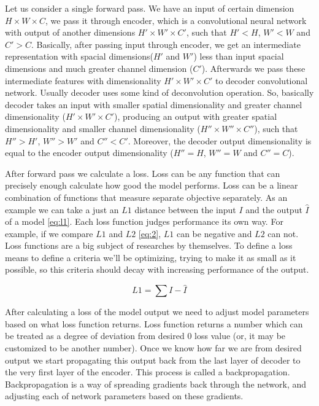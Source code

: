 Let us consider a single forward pass. We have an input of certain dimension $H \times W \times C$, we pass it through encoder, which is a convolutional neural network with output of another dimensions $H' \times W' \times C'$, such that $H' < H$, $W' < W$ and $C' > C$. Basically, after passing input through encoder, we get an intermediate representation with spacial dimensions($H'$ and $W'$) less than input spacial dimensions and much greater channel dimension ($C'$). Afterwards we pass these intermediate features with dimensionality $H' \times W' \times C'$ to decoder convolutional network. Usually decoder uses some kind of deconvolution operation. So, basically decoder takes an input with smaller spatial dimensionality and greater channel dimensionality ($H' \times W' \times C'$), producing an output with greater spatial dimensionality and smaller channel dimensionality ($H'' \times W'' \times C''$), such that $H'' > H'$, $W'' > W'$ and $C'' < C'$. Moreover, the decoder output dimensionality is equal to the encoder output dimensionality ($H'' = H$, $W'' = W$ and $C'' = C$).

After forward pass we calculate a loss. Loss can be any function that can precisely enough calculate how good the model performs. Loss can be a linear combination of functions that measure separate objective separately. As an example we can take a just an $L1$ distance between the input $I$ and the output $\hat{I}$ of a model \ref{eq:l1}. Each loss function judges performance its own way. For example, if we compare $L1$ and $L2$ \ref{eq:2}, $L1$ can be negative and $L2$ can not. Loss functions are a big subject of researches by themselves. To define a loss means to define a criteria we'll be optimizing, trying to make it as small as it possible, so this criteria should decay with increasing performance of the output.

\begin{equation}
    \label{eq:l1}
    L1=\sum{I-\hat{I}}
\end{equation}

After calculating a loss of the model output we need to adjust model parameters based on what loss function returns. Loss function returns a number which can be treated as a degree of deviation from desired $0$ loss value (or, it may be customized to be another number). Once we know how far we are from desired output we start propagating this output back from the last layer of decoder to the very first layer of the encoder. This process is called a backpropagation. Backpropagation is a way of spreading gradients back through the network, and adjusting each of network parameters based on these gradients.

